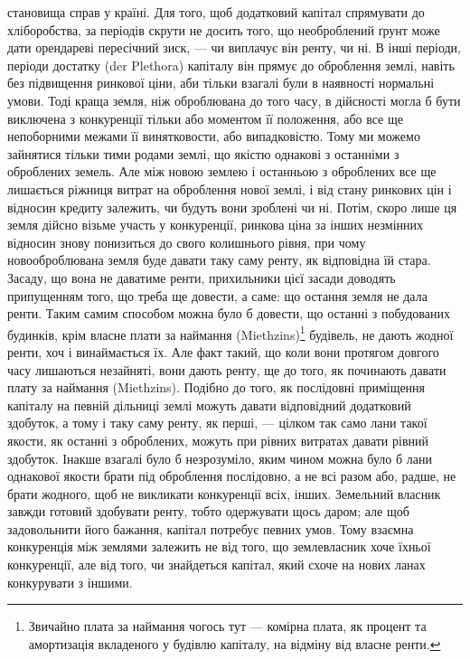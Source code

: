 \parcont{}  %
становища справ у країні. Для того, щоб додатковий капітал спрямувати до
хліборобства, за періодів скрути не досить того, що необроблений ґрунт може
дати орендареві пересічний зиск, — чи виплачує він ренту, чи ні. В інші періоди,
періоди достатку (der Plethora) капіталу він прямує до оброблення землі, навіть
без підвищення ринкової ціни, аби тільки взагалі були в наявності нормальні
умови. Тоді краща земля, ніж оброблювана до того часу, в дійсності могла б
бути виключена з конкуренції тільки або моментом її положення, або все ще
непоборними межами її винятковости, або випадковістю. Тому ми можемо зайнятися
тільки тими родами землі, що якістю однакові з останніми з оброблених
земель. Але між новою землею і останньою з оброблених все ще лишається
ріжниця витрат на оброблення нової землі, і від стану ринкових цін і відносин
кредиту залежить, чи будуть вони зроблені чи ні. Потім, скоро лише ця земля
дійсно візьме участь у конкуренції, ринкова ціна за інших незмінних відносин
знову понизиться до свого колишнього рівня, при чому новооброблювана земля
буде давати таку саму ренту, як відповідна їй стара. Засаду, що вона не даватиме
ренти, прихильники цієї засади доводять припущенням того, що треба ще довести,
а саме: що остання земля не дала ренти. Таким самим способом можна було б довести,
що останні з побудованих будинків, крім власне плати за наймання (Miethzins)\footnote*{
Звичайно плата за наймання чогось тут — комірна плата, як процент та амортизація
вкладеного у будівлю капіталу, на відміну від власне ренти. 
}
будівель, не дають жодної ренти, хоч і винаймається їх. Але факт такий,
що коли вони протягом довгого часу лишаються незайняті, вони дають ренту, ще
до того, як починають давати плату за наймання (Miethzins). Подібно до того,
як послідовні приміщення капіталу на певній дільниці землі можуть давати
відповідний додатковий здобуток, а тому і таку саму ренту, як перші, — цілком
так само лани такої якости, як останні з оброблених, можуть при рівних витратах
давати рівний здобуток. Інакше взагалі було б незрозуміло, яким чином
можна було б лани однакової якости брати під оброблення послідовно, а не
всі разом або, радше, не брати жодного, щоб не викликати конкуренції всіх,
інших. Земельний власник завжди готовий здобувати ренту, тобто одержувати
щось даром; але щоб задовольнити його бажання, капітал потребує певних
умов. Тому взаємна конкуренція між землями залежить не від того, що землевласник
хоче їхньої конкуренції, але від того, чи знайдеться капітал, який
схоче на нових ланах конкурувати з іншими.

